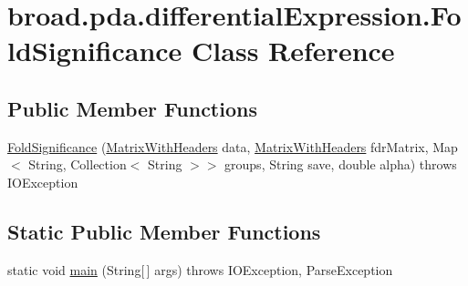 \hypertarget{classbroad_1_1pda_1_1differential_expression_1_1_fold_significance}{\section{broad.\+pda.\+differential\+Expression.\+Fold\+Significance Class Reference}
\label{classbroad_1_1pda_1_1differential_expression_1_1_fold_significance}
}
\subsection*{Public Member Functions}
\begin{DoxyCompactItemize}
\item 
\hyperlink{classbroad_1_1pda_1_1differential_expression_1_1_fold_significance_acaa171d2fc9fd67d5d12d862082e17e5}{Fold\+Significance} (\hyperlink{classbroad_1_1core_1_1datastructures_1_1_matrix_with_headers}{Matrix\+With\+Headers} data, \hyperlink{classbroad_1_1core_1_1datastructures_1_1_matrix_with_headers}{Matrix\+With\+Headers} fdr\+Matrix, Map$<$ String, Collection$<$ String $>$$>$ groups, String save, double alpha)  throws I\+O\+Exception
\end{DoxyCompactItemize}
\subsection*{Static Public Member Functions}
\begin{DoxyCompactItemize}
\item 
static void \hyperlink{classbroad_1_1pda_1_1differential_expression_1_1_fold_significance_ab0fcd2638e917d36fd6284cb61af2075}{main} (String\mbox{[}$\,$\mbox{]} args)  throws I\+O\+Exception, Parse\+Exception
\end{DoxyCompactItemize}


